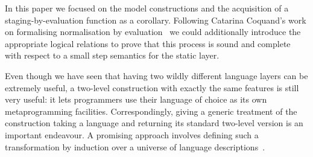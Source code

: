 In this paper we focused on the model constructions and the
acquisition of a staging-by-evaluation function as a corollary.
Following Catarina Coquand's work on formalising normalisation
by evaluation~\cite{DBLP:journals/lisp/Coquand02} we could
additionally introduce the appropriate logical relations to
prove that this process is sound and complete with respect
to a small step semantics for the static layer.


Even though we have seen that having two wildly different
language layers can be extremely useful, a two-level
construction with exactly the same features is still very
useful: it lets programmers use their language of choice
as its own metaprogramming facilities.
%
Correspondingly, giving a generic treatment of the construction
taking a language and returning its standard two-level version
is an important endeavour.
%
A promising approach involves defining such a transformation
by induction over a universe of language
descriptions~\cite{DBLP:journals/jfp/AllaisACMM21}.

